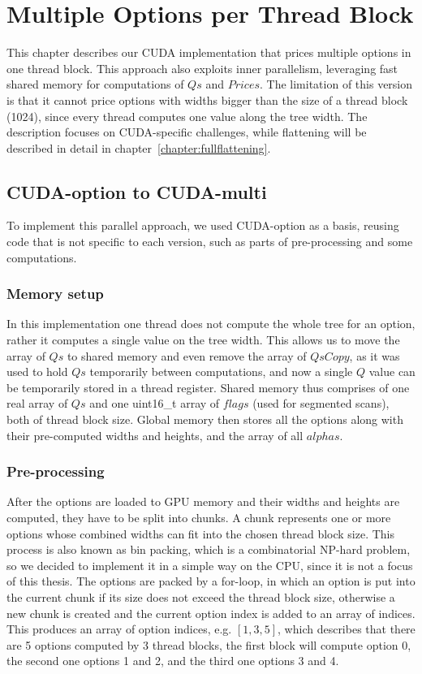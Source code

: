 \chapter{Multiple Options per Thread Block}
\label{chapter:multoptionsperthreadblock}

This chapter describes our CUDA implementation that prices multiple options in one thread block. This approach also exploits inner parallelism, leveraging fast shared memory for computations of $\mathit{Qs}$ and $\mathit{Prices}$. The limitation of this version is that it cannot price options with widths bigger than the size of a thread block (1024), since every thread computes one value along the tree width. The description focuses on CUDA-specific challenges, while flattening will be described in detail in chapter~\ref{chapter:fullflattening}. 

\section{CUDA-option to CUDA-multi}
To implement this parallel approach, we used CUDA-option as a basis, reusing code that is not specific to each version, such as parts of pre-processing and some computations.

\subsection*{Memory setup}
In this implementation one thread does not compute the whole tree for an option, rather it computes a single value on the tree width. This allows us to move the array of $\mathit{Qs}$ to shared memory and even remove the array of $\mathit{QsCopy}$, as it was used to hold $\mathit{Qs}$ temporarily between computations, and now a single $Q$ value can be temporarily stored in a thread register. Shared memory thus comprises of one real array of $\mathit{Qs}$ and one uint16\_t array of $\mathit{flags}$ (used for segmented scans), both of thread block size. Global memory then stores all the options along with their pre-computed widths and heights, and the array of all $\mathit{alphas}$.

\subsection*{Pre-processing}
After the options are loaded to GPU memory and their widths and heights are computed, they have to be split into chunks. A chunk represents one or more options whose combined widths can fit into the chosen thread block size. This process is also known as bin packing, which is a combinatorial NP-hard problem, so we decided to implement it in a simple way on the CPU, since it is not a focus of this thesis. The options are packed by a for-loop, in which an option is put into the current chunk if its size does not exceed the thread block size, otherwise a new chunk is created and the current option index is added to an array of indices. This produces an array of option indices, e.g. $[1, 3, 5]$, which describes that there are 5 options computed by 3 thread blocks, the first block will compute option 0, the second one options 1 and 2, and the third one options 3 and 4.

